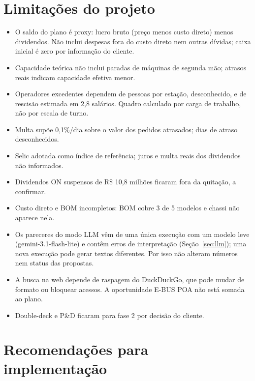 \documentclass[12pt,a4paper,oneside,brazil]{abntex2}
\begin{document}
\section{Limitações do projeto}

\begin{itemize}
\item O saldo do plano é proxy: lucro bruto (preço menos custo direto) menos dividendos. Não inclui despesas fora do custo direto nem outras dívidas; caixa inicial é zero por informação do cliente.
\item Capacidade teórica não inclui paradas de máquinas de segunda mão; atrasos reais indicam capacidade efetiva menor.
\item Operadores excedentes dependem de pessoas por estação, desconhecido, e de rescisão estimada em 2,8 salários. Quadro calculado por carga de trabalho, não por escala de turno.
\item Multa supõe 0,1\%/dia sobre o valor dos pedidos atrasados; dias de atraso desconhecidos.
\item Selic adotada como índice de referência; juros e multa reais dos dividendos não informados.
\item Dividendos ON suspensos de R\$ 10,8 milhões ficaram fora da quitação, a confirmar.
\item Custo direto e BOM incompletos: BOM cobre 3 de 5 modelos e chassi não aparece nela.
\item Os pareceres do modo LLM vêm de uma única execução com um modelo leve (gemini-3.1-flash-lite) e contêm erros de interpretação (Seção~\ref{sec:llm}); uma nova execução pode gerar textos diferentes. Por isso não alteram números nem status das propostas.
\item A busca na web depende de raspagem do DuckDuckGo, que pode mudar de formato ou bloquear acessos. A oportunidade E-BUS POA não está somada ao plano.
\item Double-deck e P\&D ficaram para fase 2 por decisão do cliente.
\end{itemize}

\section{Recomendações para implementação}
\end{document}
